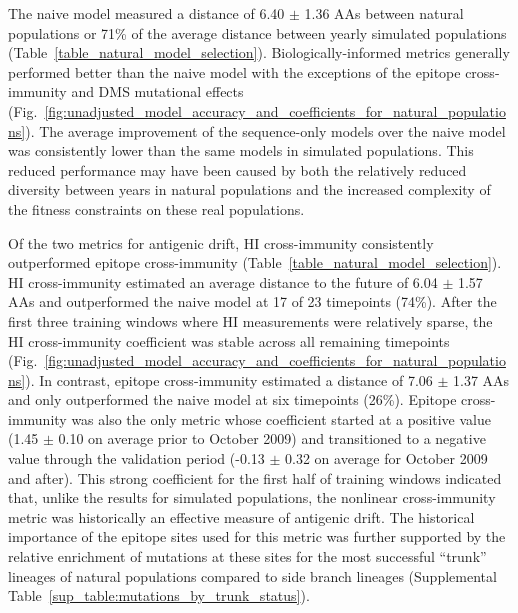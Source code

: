 The naive model measured a distance of 6.40 $\pm$ 1.36 AAs between natural populations or 71\% of the average distance between yearly simulated populations (Table~\ref{table_natural_model_selection}).
Biologically-informed metrics generally performed better than the naive model with the exceptions of the epitope cross-immunity and DMS mutational effects (Fig.~\ref{fig:unadjusted_model_accuracy_and_coefficients_for_natural_populations}).
The average improvement of the sequence-only models over the naive model was consistently lower than the same models in simulated populations.
This reduced performance may have been caused by both the relatively reduced diversity between years in natural populations and the increased complexity of the fitness constraints on these real populations.

Of the two metrics for antigenic drift, HI cross-immunity consistently outperformed epitope cross-immunity (Table~\ref{table_natural_model_selection}).
HI cross-immunity estimated an average distance to the future of 6.04 $\pm$ 1.57 AAs and outperformed the naive model at 17 of 23 timepoints (74\%).
After the first three training windows where HI measurements were relatively sparse, the HI cross-immunity coefficient was stable across all remaining timepoints (Fig.~\ref{fig:unadjusted_model_accuracy_and_coefficients_for_natural_populations}).
In contrast, epitope cross-immunity estimated a distance of 7.06 $\pm$ 1.37 AAs and only outperformed the naive model at six timepoints (26\%).
Epitope cross-immunity was also the only metric whose coefficient started at a positive value (1.45 $\pm$ 0.10 on average prior to October 2009) and transitioned to a negative value through the validation period (-0.13 $\pm$ 0.32 on average for October 2009 and after).
This strong coefficient for the first half of training windows indicated that, unlike the results for simulated populations, the nonlinear cross-immunity metric was historically an effective measure of antigenic drift.
The historical importance of the epitope sites used for this metric was further supported by the relative enrichment of mutations at these sites for the most successful ``trunk'' lineages of natural populations compared to side branch lineages (Supplemental Table~\ref{sup_table:mutations_by_trunk_status}).


